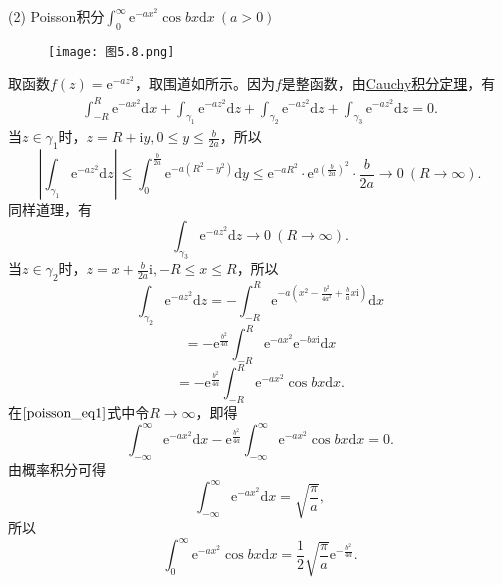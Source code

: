 \documentclass[../../main.tex]{subfiles}
\begin{document}
(2) Poisson积分\(\int_{0}^{\infty} \mathrm{e}^{-ax^2} \cos bx \mathrm{d}x \ (a > 0)\)
\begin{figure}[H]
\centering
\texttt{[image: 图5.8.png]}
\caption{}
\label{figure:图5.8}
\end{figure}
取函数\( f(z) = \mathrm{e}^{-az^2} \)，取围道如所示。因为\( f \)是整函数，由\hyperref[theorem:Cauchy-Goursat定理(Cauchy积分定理)]{Cauchy积分定理}，有
\begin{align}
\int_{-R}^{R} \mathrm{e}^{-ax^2} \mathrm{d}x + \int_{\gamma_1} \mathrm{e}^{-az^2} \mathrm{d}z + \int_{\gamma_2} \mathrm{e}^{-az^2} \mathrm{d}z + \int_{\gamma_3} \mathrm{e}^{-az^2} \mathrm{d}z = 0. \label{poisson_eq1}
\end{align}
当\( z \in \gamma_1 \)时，\( z = R + \mathrm{i}y, 0 \leqslant y \leqslant \frac{b}{2a} \)，所以
\[
\left| \int_{\gamma_1} \mathrm{e}^{-az^2} \mathrm{d}z \right| \leqslant \int_{0}^{\frac{b}{2a}} \mathrm{e}^{-a(R^2 - y^2)} \mathrm{d}y
\leqslant \mathrm{e}^{-aR^2} \cdot \mathrm{e}^{a\left( \frac{b}{2a} \right)^2} \cdot \frac{b}{2a}
\to 0 \ (R \to \infty).
\]
同样道理，有
\[
\int_{\gamma_3} \mathrm{e}^{-az^2} \mathrm{d}z \to 0 \ (R \to \infty).
\]
当\( z \in \gamma_2 \)时，\( z = x + \frac{b}{2a} \mathrm{i}, -R \leqslant x \leqslant R \)，所以
\[
\int_{\gamma_2} \mathrm{e}^{-az^2} \mathrm{d}z = - \int_{-R}^{R} \mathrm{e}^{-a \left( x^2 - \frac{b^2}{4a^2} + \frac{b}{a} x \mathrm{i} \right)} \mathrm{d}x
\]
\[
= - \mathrm{e}^{\frac{b^2}{4a}} \int_{-R}^{R} \mathrm{e}^{-ax^2} \mathrm{e}^{-b x \mathrm{i}} \mathrm{d}x
\]
\[
= - \mathrm{e}^{\frac{b^2}{4a}} \int_{-R}^{R} \mathrm{e}^{-ax^2} \cos bx \mathrm{d}x.
\]
在\(\eqref{poisson_eq1}\)式中令\( R \to \infty \)，即得
\[
\int_{-\infty}^{\infty} \mathrm{e}^{-ax^2} \mathrm{d}x - \mathrm{e}^{\frac{b^2}{4a}} \int_{-\infty}^{\infty} \mathrm{e}^{-ax^2} \cos bx \mathrm{d}x = 0.
\]
由概率积分可得
\[
\int_{-\infty}^{\infty} \mathrm{e}^{-ax^2} \mathrm{d}x = \sqrt{\frac{\pi}{a}},
\]
所以
\[
\int_{0}^{\infty} \mathrm{e}^{-ax^2} \cos bx \mathrm{d}x = \frac{1}{2} \sqrt{\frac{\pi}{a}} \mathrm{e}^{-\frac{b^2}{4a}}.
\]
\end{document}
